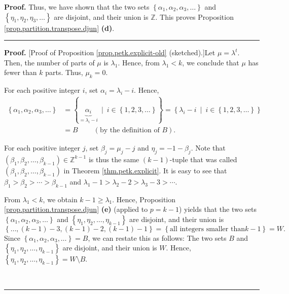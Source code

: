 \documentclass[numbers=enddot,12pt,final,onecolumn,notitlepage]{scrartcl}%
\theoremstyle{definition}
\newenvironment{proof}[1][Proof]{\noindent\textbf{#1.} }{\ \rule{0.5em}{0.5em}}
\newenvironment{verlong}{}{}
\begin{document}
\begin{verlong}
\begin{proof}
Thus, we have shown that the two sets $\left\{  \alpha_{1},\alpha_{2}%
,\alpha_{3},\ldots\right\}  $ and $\left\{  \eta_{1},\eta_{2},\eta_{3}%
,\ldots\right\}  $ are disjoint, and their union is $\mathbb{Z}$. This proves
Proposition \ref{prop.partition.transpose.djun} \textbf{(d)}.
\end{proof}
\end{verlong}

\begin{proof}
[Proof of Proposition \ref{prop.petk.explicit-old} (sketched).]Let
$\mu=\lambda^{t}$. Then, the number of parts of $\mu$ is $\lambda_{1}$. Hence,
from $\lambda_{1}<k$, we conclude that $\mu$ has fewer than $k$ parts. Thus,
$\mu_{k}=0$.

For each positive integer $i$, set $\alpha_{i}=\lambda_{i}-i$. Hence,%
\begin{align*}
\left\{  \alpha_{1},\alpha_{2},\alpha_{3},\ldots\right\}   &  =\left\{
\underbrace{\alpha_{i}}_{=\lambda_{i}-i}\ \mid\ i\in\left\{  1,2,3,\ldots
\right\}  \right\}  =\left\{  \lambda_{i}-i\ \mid\ i\in\left\{  1,2,3,\ldots
\right\}  \right\} \\
&  =B\ \ \ \ \ \ \ \ \ \ \left(  \text{by the definition of }B\right)  .
\end{align*}


For each positive integer $j$, set $\beta_{j}=\mu_{j}-j$ and $\eta
_{j}=-1-\beta_{j}$. Note that $\left(  \beta_{1},\beta_{2},\ldots,\beta
_{k-1}\right)  \in\mathbb{Z}^{k-1}$ is thus the same $\left(  k-1\right)
$-tuple that was called $\left(  \beta_{1},\beta_{2},\ldots,\beta
_{k-1}\right)  $ in Theorem \ref{thm.petk.explicit}. It is easy to see that
$\beta_{1}>\beta_{2}>\cdots>\beta_{k-1}$ and $\lambda_{1}-1>\lambda
_{2}-2>\lambda_{3}-3>\cdots$.

From $\lambda_{1}<k$, we obtain $k-1\geq\lambda_{1}$. Hence, Proposition
\ref{prop.partition.transpose.djun} \textbf{(e)} (applied to $p=k-1$) yields
that the two sets $\left\{  \alpha_{1},\alpha_{2},\alpha_{3},\ldots\right\}  $
and $\left\{  \eta_{1},\eta_{2},\ldots,\eta_{k-1}\right\}  $ are disjoint, and
their union is
\[
\left\{  \ldots,\left(  k-1\right)  -3,\left(  k-1\right)  -2,\left(
k-1\right)  -1\right\}  =\left\{  \text{all integers smaller than
}k-1\right\}  =W.
\]
Since $\left\{  \alpha_{1},\alpha_{2},\alpha_{3},\ldots\right\}  =B$, we can
restate this as follows: The two sets $B$ and $\left\{  \eta_{1},\eta
_{2},\ldots,\eta_{k-1}\right\}  $ are disjoint, and their union is $W$. Hence,
$\left\{  \eta_{1},\eta_{2},\ldots,\eta_{k-1}\right\}  =W\setminus B$.


\end{proof}
\end{document}
